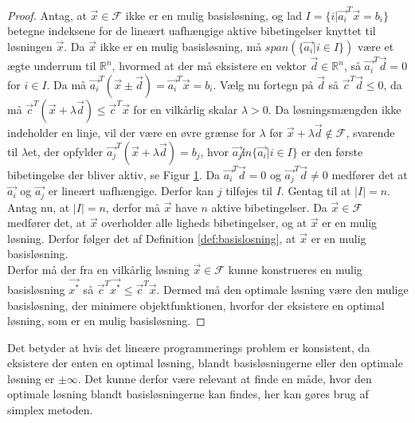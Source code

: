 \begin{proof}
Antag, at $\vec{x} \in \mathcal{F}$ ikke er en mulig basisløsning, og lad $I =\{i | \vec{a_i}^T\vec{x}=b_i\}$ betegne indeksene for de lineært uafhængige aktive bibetingelser knyttet til løsningen $\vec{x}$.
Da $\vec{x}$ ikke er en mulig basisløsning, må $span(\{\vec{a_i}|i\in I\})$ være et ægte underrum til $\mathds{R}^n$, hvormed at der må eksistere en vektor $\vec{d} \in \mathds{R}^n$, så $\vec{a_i}^T\vec{d}=0$ for $i \in I$.
Da må $\vec{a_i}^T(\vec{x}\pm \vec{d})= \vec{a_i}^T\vec{x}=b_i$.
Vælg nu fortegn på $\vec{d}$ så $\vec{c}^T\vec{d}\leq 0$, da må $\vec{c}^T(\vec{x}+\lambda\vec{d}) \leq \vec{c}^T\vec{x}$ for en vilkårlig skalar $\lambda > 0$.
Da løsningsmængden ikke indeholder en linje, vil der være en øvre grænse for $\lambda$ før $\vec{x}+\lambda\vec{d} \notin \mathcal{F}$, svarende til $\lambda$et, der opfylder $\vec{a_j}^T(\vec{x}+\lambda\vec{d})=b_j$, hvor $\vec{a_j} \not in \{\vec{a_i}|i\in I\}$ er den første bibetingelse der bliver aktiv, se Figur \ref{fig:eksistens}.
Da $\vec{a_i}^T\vec{d}=0$ og $\vec{a_j}^T\vec{d} \neq 0$ medfører det at $\vec{a_i}$ og $\vec{a_j}$  er lineært uafhængige. 
Derfor kan $j$ tilføjes til $I$.
Gentag til at $|I|=n$.
\\ Antag nu, at $|I|=n$, derfor må $\vec{x}$ have $n$ aktive bibetingelser.
Da $\vec{x}\in \mathcal{F}$ medfører det, at $\vec{x}$ overholder alle ligheds bibetingelser, og at $\vec{x}$ er en mulig løsning. 
Derfor følger det af Definition \ref{def:basislosning}, at $\vec{x}$ er en mulig basisløsning.
\\Derfor må der fra en vilkårlig løsning $\vec{x}\in \mathcal{F}$ kunne konstrueres en mulig basisløsning $\vec{x^*}$ så $\vec{c}^T\vec{x^*} \leq \vec{c}^T \vec{x}$.
Dermed må den optimale løsning være den mulige basisløsning, der minimere objektfunktionen, hvorfor der eksistere en optimal løsning, som er en mulig basisløsning.
\end{proof}
\begin{figure}
\begin{center}
	
	\label{fig:eksistens}
\end{center}
\end{figure}
Det betyder at hvis det lineære programmerings problem er konsistent, da eksistere der enten en optimal løsning, blandt basisløsningerne eller den optimale løsning er $\pm \infty$.
Det kunne derfor være relevant at finde en måde, hvor den optimale løsning blandt basisløsningerne kan findes, her kan gøres brug af simplex metoden.



